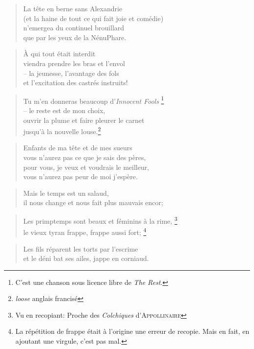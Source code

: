   \begin{verse}
    La tête en berne sans Alexandrie\\
    (et la haine de tout ce qui fait joie et comédie)\\
    n’emergea du continuel brouillard\\
    que par les yeux de la NénuPhare.
  \end{verse}
  \begin{verse}
    À qui tout était interdit\\
    viendra prendre les bras et l’envol\\
    -- la jeunesse, l’avantage des fols\\
    et l’excitation des castrés instruits!
  \end{verse}
  \begin{verse}
    Tu m’en donneras beaucoup d’\emph{Innocent Fools}
      \footnote{C’est une chanson sous licence libre de \emph{The Rest}.}\\
    -- le reste est de mon choix,\\
    ouvrir la plume et faire pleurer le carnet\\
    jusqu’à la nouvelle louse.\footnote{\emph{loose} anglais francisé}
  \end{verse}
  \begin{verse}
    Enfants de ma tête et de mes sueurs\\
    vous n’aurez pas ce que je sais des pères,\\
    pour vous, je veux et voudrais le meilleur,\\
    vous n’aurez pas peur de moi j’espère.
  \end{verse}
  \begin{verse}
    Mais le temps est un salaud,\\
    il nous change et nous fait plus mauvais encor;
  \end{verse}
  \begin{verse}
    Les primptemps sont beaux et féminins à la rime,
      \footnote{Vu en recopiant: Proche des \emph{Colchiques} d’\textsc{Appollinaire}}\\
    le vieux tyran frappe, frappe aussi fort;
    \footnote{
      La répétition de frappe était à l’origine une erreur de recopie.
      Mais en fait, en ajoutant une virgule, c’est pas mal.
    }
  \end{verse}
  \begin{verse}
    Les fils réparent les torts par l’escrime\\
    et le déni bat ses ailes, jappe en corniaud.
  \end{verse}
